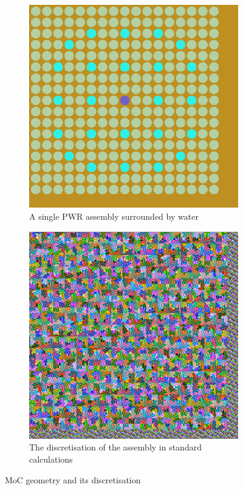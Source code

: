 \documentclass{article}
\begin{document}
\begin{figure}[h!]
     \centering
    \begin{subfigure}[t]{0.45\textwidth}%
    \captionsetup{justification=centering}
         \includegraphics[scale=0.65]{./images/assembly.png}%
         \caption{A single PWR assembly surrounded by water}
         \label{fig:C5G7}
    \end{subfigure}
    \begin{subfigure}[t]{0.45\textwidth}
    \captionsetup{justification=centering}
         \includegraphics[scale=0.555]{./images/assembly_disc.png} 
	       \caption{The discretisation of the assembly in standard calculations} 
	       \label{fig:MGMC_cells}
    \end{subfigure}
  
    \caption{MoC geometry and its discretisation}
    \label{fig:disc}
\end{figure}
\end{document}
